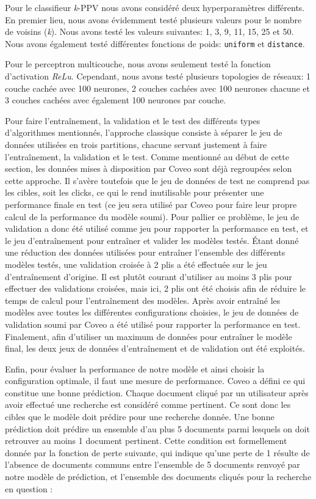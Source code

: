 Pour le classifieur \textit{k}-PPV nous avons considéré deux hyperparamètres différents. En premier lieu, nous avons évidemment testé plusieurs valeurs pour le nombre de voisins (\textit{k}). Nous avons testé les valeurs suivantes: 1, 3, 9, 11, 15, 25 et 50. 
Nous avons également testé différentes fonctions de poids: \texttt{uniform} et \texttt{distance}.

Pour le perceptron multicouche, nous avons seulement testé la fonction d'activation \textit{ReLu}. Cependant, nous avons testé plusieurs topologies de réseaux: 1 couche cachée avec 100 neurones, 2 couches cachées avec 100 neurones chacune et 3 couches cachées avec également 100 neurones par couche.
\break

Pour faire l'entraînement, la validation et le test des différents types d'algorithmes mentionnés, l'approche classique consiste à séparer le jeu de données utilisées en trois partitions, chacune servant justement à faire l'entraînement, la validation et le test. Comme mentionné au début de cette section, les données mises à disposition par Coveo sont déjà regroupées selon cette approche. Il s'avère toutefois que le jeu de données de test ne comprend pas les cibles, soit les clicks, ce qui le rend inutilisable pour présenter une performance finale en test (ce jeu sera utilisé par Coveo pour faire leur propre calcul de la performance du modèle soumi). Pour pallier ce problème, le jeu de validation a donc été utilisé comme jeu pour rapporter la performance en test, et le jeu d'entraînement pour entraîner et valider les modèles testés. Étant donné une réduction des données utilisées pour entraîner l'ensemble des différents modèles testés, une validation croisée à 2 plis a été effectuée sur le jeu d'entraînement d'origine. Il est plutôt courant d'utiliser au moins 3 plis pour effectuer des validations croisées, mais ici, 2 plis ont été choisis afin de réduire le temps de calcul pour l'entraînement des modèles. Après avoir entraîné les modèles avec toutes les différentes configurations choisies, le jeu de données de validation soumi par Coveo a été utilisé pour rapporter la performance en test. Finalement, afin d'utiliser un maximum de données pour entraîner le modèle final, les deux jeux de données d'entraînement et de validation ont été exploités.
\break

Enfin, pour évaluer la performance de notre modèle et ainsi choisir la configuration optimale, il faut une mesure de performance. Coveo a défini ce qui constitue une bonne prédiction. Chaque document cliqué par un utilisateur après avoir effectué une recherche est considéré comme pertinent. Ce sont donc les cibles que le modèle doit prédire pour une recherche donnée. Une bonne prédiction doit prédire un ensemble d'au plus 5 documents parmi lesquels on doit retrouver au moins 1 document pertinent. Cette condition est formellement donnée par la fonction de perte suivante, qui indique qu'une perte de 1 résulte de l'absence de documents communs entre l'ensemble de 5 documents renvoyé par notre modèle de prédiction, et l'ensemble des documents cliqués pour la recherche en question :

